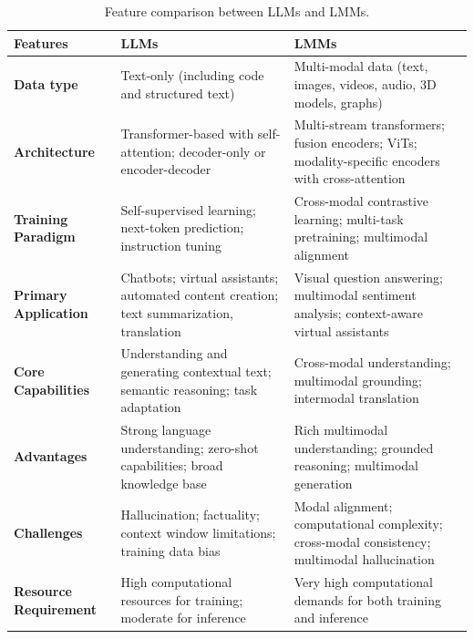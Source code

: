 \documentclass[5p,twocolumn]{elsarticle}
\begin{document}
\begin{table}[!t]
\centering
\caption{Feature comparison between LLMs and LMMs.}
\label{tab:llm-lmm}
\footnotesize
\begin{tabularx}{\linewidth}{>{\hsize=0.20\hsize}X>{\hsize=0.40\hsize}X>{\hsize=0.40\hsize}X} 
\toprule
\textbf{Features} & \textbf{LLMs} & \textbf{LMMs} \\\toprule 

\textbf{Data type} & Text-only (including code and structured text) & Multi-modal data (text, images, videos, audio, 3D models, graphs) \\\hline 

\textbf{Architecture} & Transformer-based with self-attention; decoder-only or encoder-decoder & Multi-stream transformers; fusion encoders; ViTs; modality-specific encoders with cross-attention \\\hline 

\textbf{Training Paradigm} & Self-supervised learning; next-token prediction; \newline instruction tuning & Cross-modal contrastive learning; multi-task \newline pretraining; multimodal alignment \\\hline 

\textbf{Primary Application} & Chatbots; virtual assistants; automated \newline content creation; text summarization, translation & Visual question answering; multimodal sentiment analysis; context-aware virtual assistants \\\hline 

\textbf{Core Capabilities} & Understanding and generating contextual text; \newline semantic reasoning; task adaptation & Cross-modal understanding; multimodal grounding; intermodal translation \\\hline 

\textbf{Advantages} & Strong language understanding; zero-shot \newline capabilities; broad knowledge base & Rich multimodal understanding; grounded \newline reasoning; multimodal generation \\\hline 

\textbf{Challenges} & Hallucination; factuality; context window \newline limitations; training data bias & Modal alignment; computational complexity; cross-modal consistency; multimodal hallucination \\\hline 

\textbf{Resource Requirement} & High computational resources for training; \newline moderate for inference & Very high computational demands for both training and inference \\\bottomrule

\end{tabularx}
\end{table}
\end{document}

